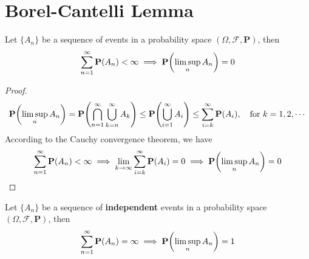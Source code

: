 \section{Borel-Cantelli Lemma}
\begin{theorem}
    Let $\{A_n\}$ be a sequence of events in a probability space $(\Omega, \mathcal{F}, \mathbf{P})$, then
    \begin{equation}
        \sum_{n=1}^{\infty} \mathbf{P}(A_n) < \infty \implies \mathbf{P}\qty(\limsup_n A_n) = 0
    \end{equation}
\end{theorem}
\begin{proof}
    \begin{equation}
        \mathbf{P}\qty(\limsup_n A_n) = \mathbf{P}\qty(\bigcap_{n=1}^{\infty} \bigcup_{k=n}^{\infty} A_k) \leq \mathbf{P}\qty(\bigcup_{i=1}^{\infty} A_i) \leq \sum_{i=k}^{\infty} \mathbf{P}(A_i), \quad \text{for } k = 1, 2, \cdots
    \end{equation}
    According to the Cauchy convergence theorem, we have
    \begin{equation}
        \sum_{n=1}^{\infty} \mathbf{P}(A_n) < \infty \implies \lim_{k \to \infty} \sum_{i=k}^{\infty} \mathbf{P}(A_i) = 0 \implies \mathbf{P}\qty(\limsup_n A_n) = 0
    \end{equation}
\end{proof}
\begin{theorem}
    Let $\{A_n\}$ be a sequence of \textbf{independent} events in a probability space $(\Omega, \mathcal{F}, \mathbf{P})$, then
    \begin{equation}
        \sum_{n=1}^{\infty} \mathbf{P}(A_n) = \infty \implies \mathbf{P}\qty(\limsup_n A_n) = 1
    \end{equation}
\end{theorem}
